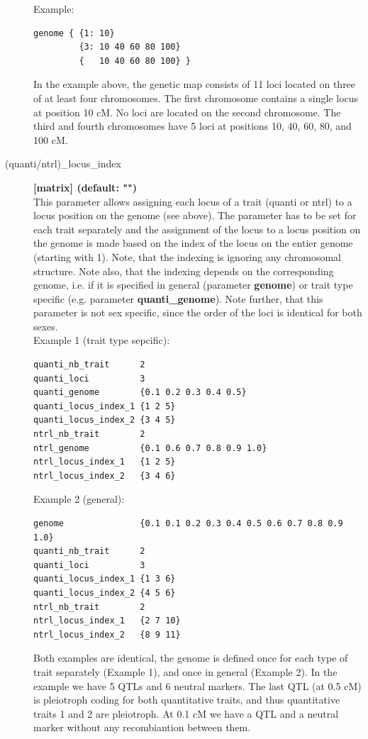\documentclass[letterpaper,12pt,oneside]{book}
\begin{document}
\begin{description}
Example:
\begin{lstlisting}[frame=single]
genome { {1: 10}
         {3: 10 40 60 80 100}
         {   10 40 60 80 100} }
\end{lstlisting} 
In the example above, the genetic map consists of 11 loci located on three of at least four
chromosomes. The first chromosome contains a single locus at position 10 cM. No loci are located on
the second chromosome. The third and fourth chromosomes have 5 loci at positions 10, 40, 60, 80, and 100 cM.


\item[(quanti/ntrl)\_locus\_index\index{quanti\_locus\_index}\index{ntrl\_locus\_index}]\textbf{[matrix]
(default: "")}\\
This parameter allows assigning each locus of a trait (quanti or ntrl) to a locus position on the genome (see above). The parameter has to be set for each trait
separately and the assignment of the locus to a locus position on the genome is made based on the
index of the locus on the entier genome (starting with 1). Note, that the indexing is ignoring any
chromosomal structure. Note also, that the indexing depends on the corresponding genome, i.e. if it
is specified in general (parameter \textbf{genome}) or trait type specific (e.g. parameter
\textbf{quanti\_genome}). Note further, that this parameter is not sex specific, since the
order of the loci is identical for both sexes.   \\

Example 1 (trait type sepcific):
\begin{lstlisting}[frame=single]
quanti_nb_trait      2
quanti_loci          3
quanti_genome        {0.1 0.2 0.3 0.4 0.5}
quanti_locus_index_1 {1 2 5}
quanti_locus_index_2 {3 4 5}
ntrl_nb_trait        2
ntrl_genome          {0.1 0.6 0.7 0.8 0.9 1.0}
ntrl_locus_index_1   {1 2 5}
ntrl_locus_index_2   {3 4 6}
\end{lstlisting} 

Example 2 (general):
\begin{lstlisting}[frame=single]
genome               {0.1 0.1 0.2 0.3 0.4 0.5 0.6 0.7 0.8 0.9 1.0}
quanti_nb_trait      2
quanti_loci          3
quanti_locus_index_1 {1 3 6}
quanti_locus_index_2 {4 5 6}
ntrl_nb_trait        2
ntrl_locus_index_1   {2 7 10}
ntrl_locus_index_2   {8 9 11}
\end{lstlisting} 

Both examples are identical, the genome is defined once for each type of trait separately (Example
1), and once in general (Example 2). In the example we have 5 QTLs and 6 neutral markers. The
last QTL (at 0.5 cM) is pleiotroph coding for both quantitative traits, and thus quantitative
traits 1 and 2 are pleiotroph.
At 0.1 cM we have a QTL and a neutral marker without any recombiantion between them.


\end{description}
\end{document}
